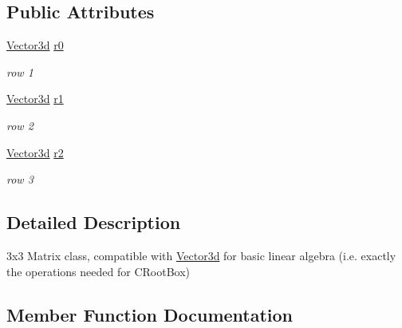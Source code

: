 \subsection*{Public Attributes}
\begin{DoxyCompactItemize}
\item 
\mbox{\label{classCPlantBox_1_1Matrix3d_ab35ef40d84f9ee9ec992e0f7868c6edf}} 
\hyperlink{classCPlantBox_1_1Vector3d}{Vector3d} \hyperlink{classCPlantBox_1_1Matrix3d_ab35ef40d84f9ee9ec992e0f7868c6edf}{r0}
\begin{DoxyCompactList}\small\item\em row 1 \end{DoxyCompactList}\item 
\mbox{\label{classCPlantBox_1_1Matrix3d_a68c25f556d573979743a8ed12adb68ed}} 
\hyperlink{classCPlantBox_1_1Vector3d}{Vector3d} \hyperlink{classCPlantBox_1_1Matrix3d_a68c25f556d573979743a8ed12adb68ed}{r1}
\begin{DoxyCompactList}\small\item\em row 2 \end{DoxyCompactList}\item 
\mbox{\label{classCPlantBox_1_1Matrix3d_a426ed493e511b936e0008384db09deca}} 
\hyperlink{classCPlantBox_1_1Vector3d}{Vector3d} \hyperlink{classCPlantBox_1_1Matrix3d_a426ed493e511b936e0008384db09deca}{r2}
\begin{DoxyCompactList}\small\item\em row 3 \end{DoxyCompactList}\end{DoxyCompactItemize}


\subsection{Detailed Description}
3x3 Matrix class, compatible with \hyperlink{classCPlantBox_1_1Vector3d}{Vector3d} for basic linear algebra (i.\+e. exactly the operations needed for C\+Root\+Box) 

\subsection{Member Function Documentation}
\mbox{\label{classCPlantBox_1_1Matrix3d_a65224dd4969719c7fc8072c6a913f4c8}} 
